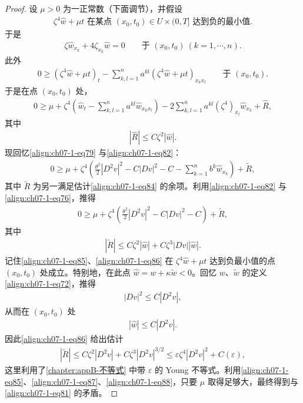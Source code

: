 \documentclass[../../main.tex]{subfiles}
\begin{document}
\begin{proof}
设 $\mu>0$ 为一正常数（下面调节），并假设
\begin{align}
\zeta^4\widehat{w}+\mu t \text{ 在某点 } (x_0,t_0)\in U\times(0,T] \text{ 达到负的最小值}.\label{align:ch07-1-eq81}
\end{align}
于是
\begin{align}
\zeta\widehat{w}_{x_k} + 4\zeta_{x_k}\widehat{w}=0\qquad \text{于 }(x_0,t_0)\ (k=1,\cdots,n).\label{align:ch07-1-eq82}
\end{align}
此外
\begin{align*}
0\geqslant (\zeta^4\widehat{w}+\mu t)_t - \sum_{k,l=1}^n a^{kl}(\zeta^4\widehat{w}+\mu t)_{x_kx_l}\qquad \text{于 }(x_0,t_0).
\end{align*}
于是在点 $(x_0,t_0)$ 处，
\begin{align}
0\geqslant \mu + \zeta^4\left(\widehat{w}_t - \sum_{k,l=1}^n a^{kl}\widehat{w}_{x_kx_l}\right) - 2\sum_{k,l=1}^n a^{kl}(\zeta^4)_{x_l}\widehat{w}_{x_k} + \widehat{R},\label{align:ch07-1-eq83}
\end{align}
其中
\begin{align}
|\widehat{R}| \leqslant C\zeta^2|\widehat{w}|.\label{align:ch07-1-eq84}
\end{align}
现回忆\eqref{align:ch07-1-eq79} 与\eqref{align:ch07-1-eq82}：
\begin{align*}
0\geqslant \mu + \zeta^4\left(\frac{\theta^2}{2}|D^2v|^2 - C|Dv|^2 - C - \sum_{k=1}^n b^k\widehat{w}_{x_k}\right) + \widetilde{R},
\end{align*}
其中 $\widetilde{R}$ 为另一满足估计\eqref{align:ch07-1-eq84} 的余项。利用\eqref{align:ch07-1-eq82} 与\eqref{align:ch07-1-eq76}，推得
\begin{align}
0\geqslant \mu + \zeta^4\left(\frac{\theta^2}{2}|D^2v|^2 - C|Dv|^2 - C\right) + \widetilde{R},\label{align:ch07-1-eq85}
\end{align}
其中
\begin{align}
|\widetilde{R}| \leqslant C\zeta^2|\widehat{w}| + C\zeta^3|Dv||\widehat{w}|.\label{align:ch07-1-eq86}
\end{align}
记住\eqref{align:ch07-1-eq85}、\eqref{align:ch07-1-eq86} 在 $\zeta^4\widehat{w}+\mu t$ 达到负最小值的点 $(x_0,t_0)$ 处成立。特别地，在此点 $\widehat{w}=w+\kappa\widetilde{w}<0$。回忆 $w$、$\widetilde{w}$ 的定义\eqref{align:ch07-1-eq72}，推得
\begin{align}
|Dv|^2 \leqslant C|D^2v|,\label{align:ch07-1-eq87}
\end{align}
从而在 $(x_0,t_0)$ 处
\begin{align*}
|\widehat{w}| \leqslant C|D^2v|.
\end{align*}
因此\eqref{align:ch07-1-eq86} 给出估计
\begin{align}
|\widetilde{R}| \leqslant C\zeta^2|D^2v| + C\zeta^3|D^2v|^{3/2} \leqslant \varepsilon\zeta^4|D^2v|^2 + C(\varepsilon),\label{align:ch07-1-eq88}
\end{align}
这里利用了\cref{chapter:appB-不等式} 中带 $\varepsilon$ 的 Young 不等式。利用\eqref{align:ch07-1-eq85}、\eqref{align:ch07-1-eq87}、\eqref{align:ch07-1-eq88}，只要 $\mu$ 取得足够大，最终得到与\eqref{align:ch07-1-eq81} 的矛盾。


\end{proof}
\end{document}
